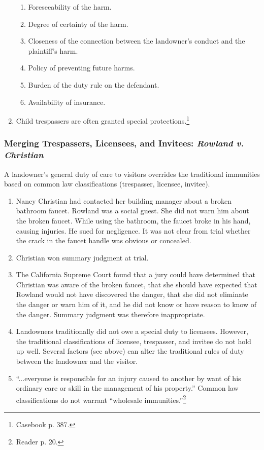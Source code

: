 \begin{enumerate}
\begin{enumerate}
        \item Foreseeability of the harm.
        \item Degree of certainty of the harm.
        \item Closeness of the connection between the landowner's conduct and 
        the plaintiff's harm.
        \item Policy of preventing future harms.
        \item Burden of the duty rule on the defendant.
        \item Availability of insurance.
    \end{enumerate}
    \item Child trespassers are often granted special 
    protections.\footnote{Casebook p. 387.}
\end{enumerate}

\subsubsection{Merging Trespassers, Licensees, and Invitees: \emph{Rowland v. 
Christian}}

A landowner's general duty of care to visitors overrides the traditional 
immunities based on common law classifications (trespasser, licensee, 
invitee).

\begin{enumerate}
    \item Nancy Christian had contacted her building manager about a broken 
    bathroom faucet. Rowland was a social guest. She did not warn him about 
    the broken faucet. While using the bathroom, the faucet broke in his hand, 
    causing injuries. He sued for negligence. It was not clear from trial 
    whether the crack in the faucet handle was obvious or concealed.
    \item Christian won summary judgment at trial.
    \item The California Supreme Court found that a jury could have determined 
    that Christian was aware of the broken faucet, that she should have 
    expected that Rowland would not have discovered the danger, that she did 
    not eliminate the danger or warn him of it, and he did not know or have 
    reason to know of the danger. Summary judgment was therefore 
    inappropriate.
    \item Landowners traditionally did not owe a special duty to licensees. 
    However, the traditional classifications of licensee, trespasser, and 
    invitee do not hold up well. Several factors (see above) can alter the 
    traditional rules of duty between the landowner and the visitor.
    \item ``...everyone is responsible for an injury caused to another by want 
    of his ordinary care or skill in the management of his property.'' Common 
    law classifications do not warrant ``wholesale 
    immunities.''\footnote{Reader p. 20.}
\end{enumerate}


